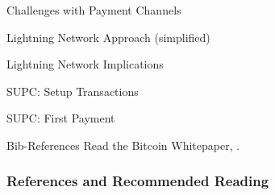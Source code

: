 \documentclass[]{beamer}
\begin{document}
\begin{frame}{Challenges with Payment Channels}


\end{frame}

\begin{frame}{Lightning Network Approach (simplified)}


\end{frame}

\begin{frame}{Lightning Network Implications}


\end{frame}

\begin{frame}{SUPC: Setup Transactions}


\end{frame}

	
\begin{frame}{SUPC: First Payment}
	
\end{frame}

\begin{frame}{Bib-References}
		Read the Bitcoin Whitepaper, \cite{nakamotoBitcoin2008}.
\end{frame}

\begin{frame}%
\frametitle{References and Recommended Reading}
	
	
\end{frame}
\end{document}
